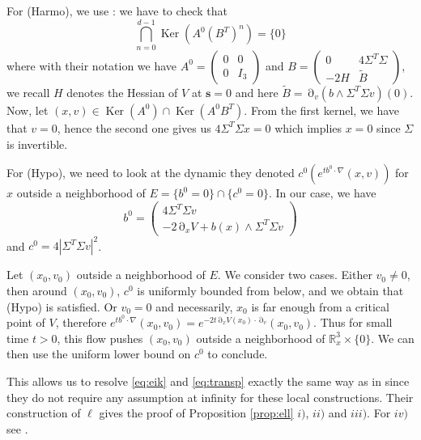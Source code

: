 \documentclass[12pt]{amsart}
\newcommand{\R}{\mathbb R}
\newcommand{\Ker}{\operatorname{Ker}}
\numberwithin{equation}{section}
\numberwithin{figure}{section}
\def\s{\mathbf{s}}
\DeclareMathOperator{\p}{\partial}
\begin{document}
For (Harmo), we use \cite[Corollary 2.4 and Remark 2.5]{BoLePMi22}: we have to check %
that
\begin{equation*}
\bigcap_{n=0}^{d-1}\Ker(A^0(B^T)^n) = \{0\}
\end{equation*}
where %
with their notation we have $A^0 = \begin{pmatrix}0&0\\0&I_3\end{pmatrix}$ and $B = \begin{pmatrix}0&4\Sigma^T\Sigma\\-2H&\tilde B\end{pmatrix}$, we recall $H$ denotes the Hessian of $V$ at $\s=0$ and here $\tilde B = \p_v(b\wedge\Sigma^T\Sigma v)(0)$. Now, let $(x,v)\in\Ker(A^0)\cap\Ker(A^0B^T)$. From the first kernel, we have that $v=0$, hence the second one gives us $4\Sigma^T\Sigma x = 0$ which implies $x=0$ since $\Sigma$ is invertible.

For (Hypo), we need to look at the dynamic they denoted $c^0(e^{tb^0\cdot\nabla}(x,v))$ for $x$ outside a neighborhood of $E = \{b^0 = 0\}\cap\{c^0 = 0\}$. In our case, we have
\begin{equation*}
b^0 = \begin{pmatrix}
    4\Sigma^T\Sigma v\\
     - 2\p_xV + b(x)\wedge \Sigma^T\Sigma v
\end{pmatrix}
\end{equation*}
and $c^0 = 4|\Sigma^T\Sigma v|^2$.

Let $(x_0,v_0)$ outside a neighborhood of $E$. We consider two cases. Either $v_0\neq0$, then around $(x_0,v_0)$, $c^0$ is uniformly bounded from below, and we obtain that (Hypo) is satisfied. Or $v_0 = 0$ and necessarily, $x_0$ is far enough from a critical point of $V$, therefore $e^{tb^0\cdot\nabla}(x_0,v_0) = e^{- 2t\p_xV(x_0)\cdot\p_v}(x_0,v_0)$. Thus for small time $t>0$, this flow pushes $(x_0,v_0)$ outside a neighborhood of $\R^3_x\times\{0\}$. We can then use the uniform lower bound on $c^0$ to conclude.

This allows us to resolve \eqref{eq:eik} and \eqref{eq:transp} exactly the same way as in \cite{BoLePMi22} since they do not require any assumption at infinity for these local constructions. Their construction of $\ell$ gives the proof of Proposition \ref{prop:ell} $i)$, $ii)$ and $iii)$. For $iv)$ %
see \cite[Lemma 4.1]{BoLePMi22}.
\end{document}
